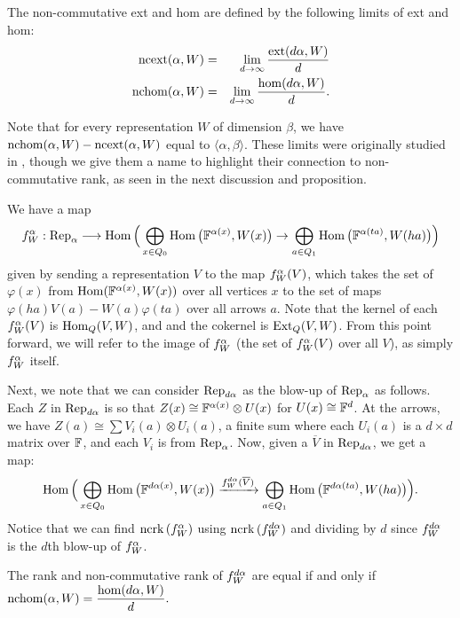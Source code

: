 \begin{definition}\label{nchomdef} The non-commutative ext and hom are defined by the following limits of ext and hom:
\begin{eqnarray*}
\operatorname{ncext}(\alpha,W)&=&\lim_{d\to\infty}\frac{\operatorname{ext}(d\alpha,W)}{d}\\
\operatorname{nchom}(\alpha,W)&=&\lim_{d\to\infty}\frac{\hom(d\alpha,W)}{d}.
\end{eqnarray*}
\end{definition}
Note that for every representation $W$ of dimension $\beta$, we have $\operatorname{nchom}(\alpha,W)-\operatorname{ncext}(\alpha,W)$ equal to $\langle\alpha,\beta\rangle$. These limits were originally studied in \cite{Craw96}, though we give them a name to highlight their connection to non-commutative rank, as seen in the next discussion and proposition.

We have a map $$f_{W}^{\alpha}:\operatorname{Rep}_\alpha \longrightarrow\operatorname{Hom}\Big(\bigoplus_{x\in Q_0}\operatorname{Hom}\big({\mathbb F}^{\alpha(x)},W(x)\big)\rightarrow\bigoplus_{a\in Q_1}\operatorname{Hom}\big({\mathbb F}^{\alpha(ta)},W(ha)\big) \Big)$$
given by sending a representation $V$ to the map $f_{W}^{\alpha}(V)$, which takes the set of $\varphi(x)$ from $\operatorname{Hom}({\mathbb F}^{\alpha(x)},W(x))$ over all vertices $x$ to the set of maps $\varphi(ha)V(a)-W(a)\varphi(ta)$ over all arrows $a$. Note that the kernel of each $f_{W}^{\alpha}(V)$ is $\operatorname{Hom}_Q(V,W)$, and and the cokernel is $\operatorname{Ext}_Q(V,W)$. From this point forward, we will refer to the image of $f_{W}^{\alpha}$ (the set of $f_{W}^{\alpha}(V)$ over all $V$), as simply $f_{W}^{\alpha}$ itself. 

Next, we note that we can consider $\operatorname{Rep}_{d\alpha}$ as the blow-up of $\operatorname{Rep}_\alpha$ as follows. Each $Z$ in $\operatorname{Rep}_{d\alpha}$ is so that $Z(x)\cong {\mathbb F}^{\alpha(x)}\otimes U(x)$ for $U(x)\cong{\mathbb F}^d$. At the arrows, we have $Z(a)\cong\sum V_i(a)\otimes U_i(a)$, a finite sum where each $U_i(a)$ is a $d\times d$ matrix over ${\mathbb F}$, and each $V_i$ is from $\operatorname{Rep}_\alpha$. Now, given a $\overline{V}$ in $\operatorname{Rep}_{d\alpha}$, we get a map:
$$\operatorname{Hom}\Big(\bigoplus_{x\in Q_0}\operatorname{Hom}\big({\mathbb F}^{d\alpha(x)},W(x)\big)\xrightarrow{f_{W}^{d\alpha}(\overline{V})}\bigoplus_{a\in Q_1}\operatorname{Hom}\big({\mathbb F}^{d\alpha(ta)},W(ha)\big) \Big).$$
Notice that we can find $\operatorname{ncrk}{(f_{W}^{\alpha})}$ using $\operatorname{ncrk}{(f_{W}^{d\alpha})}$ and dividing by $d$ since $f_{W}^{d\alpha}$ is the $d$th blow-up of $f_{W}^{\alpha}$. 

\begin{proposition}\label{samed}
The rank and non-commutative rank of $f_{W}^{d\alpha}$ are equal if and only if $\displaystyle\operatorname{nchom}(\alpha,W)=\frac{\hom(d\alpha,W)}{d}.$
\end{proposition}

